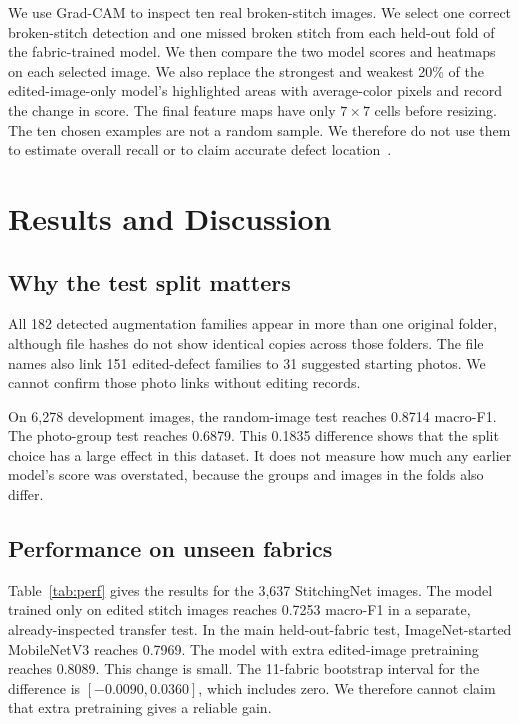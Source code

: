 \documentclass[conference,a4paper]{IEEEtran}
\begin{document}
We use Grad-CAM to inspect ten real broken-stitch images. We select one correct broken-stitch detection and one missed broken stitch from each held-out fold of the fabric-trained model. We then compare the two model scores and heatmaps on each selected image. We also replace the strongest and weakest 20\% of the edited-image-only model's highlighted areas with average-color pixels and record the change in score. The final feature maps have only $7\times7$ cells before resizing. The ten chosen examples are not a random sample. We therefore do not use them to estimate overall recall or to claim accurate defect location~\cite{selvaraju2017,adebayo2018}.

\section{Results and Discussion}
\subsection{Why the test split matters}
All 182 detected augmentation families appear in more than one original folder, although file hashes do not show identical copies across those folders. The file names also link 151 edited-defect families to 31 suggested starting photos. We cannot confirm those photo links without editing records.

On 6,278 development images, the random-image test reaches 0.8714 macro-F1. The photo-group test reaches 0.6879. This 0.1835 difference shows that the split choice has a large effect in this dataset. It does not measure how much any earlier model's score was overstated, because the groups and images in the folds also differ.

\subsection{Performance on unseen fabrics}
Table~\ref{tab:perf} gives the results for the 3,637 StitchingNet images. The model trained only on edited stitch images reaches 0.7253 macro-F1 in a separate, already-inspected transfer test. In the main held-out-fabric test, ImageNet-started MobileNetV3 reaches 0.7969. The model with extra edited-image pretraining reaches 0.8089. This change is small. The 11-fabric bootstrap interval for the difference is $[-0.0090,0.0360]$, which includes zero. We therefore cannot claim that extra pretraining gives a reliable gain.
\end{document}
